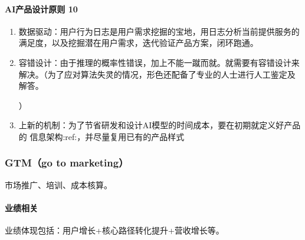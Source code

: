 \documentclass[letterpaper,11pt,english]{sphinxmanual}
\begin{document}
\paragraph{AI产品设计原则 10\sphinxfootnotemark[390]}
\label{\detokenize{chapter_idea/design:ai-10}}%
\begin{footnotetext}[390]\sphinxAtStartFootnote
{}
%
\end{footnotetext}\ignorespaces \begin{enumerate}
%
\item {} 
数据驱动：用户行为日志是用户需求挖掘的宝地，用日志分析当前提供服务的满足度，以及挖掘潜在用户需求，迭代验证产品方案，闭环跑通。

\item {} 
容错设计：由于推理的概率性错误，加上不能一蹴而就。就需要有容错设计来解决。（为了应对算法失灵的情况，形色还配备了专业的人士进行人工鉴定及解答。%
\begin{footnote}[391]\sphinxAtStartFootnote
{}
%
\end{footnote}）

\item {} 
上新的机制：为了节省研发和设计AI模型的时间成本，要在初期就定义好产品的
信息架构:ref:，并尽量复用已有的产品样式

\end{enumerate}


\subsubsection{GTM（go to marketing）}
\label{\detokenize{chapter_idea/GTM:gtm-go-to-marketing}}\label{\detokenize{chapter_idea/GTM::doc}}
市场推广、培训、成本核算。


\paragraph{业绩相关}
\label{\detokenize{chapter_idea/GTM:id1}}
业绩体现包括：用户增长+核心路径转化提升+营收增长等。%
\begin{footnote}[392]\sphinxAtStartFootnote
{}
%
\end{footnote}
\end{document}
